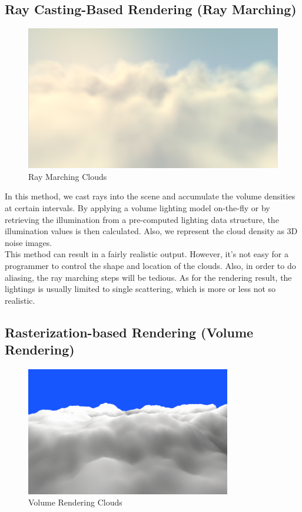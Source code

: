 \subsection{Ray Casting-Based Rendering (Ray Marching)}
\begin{figure}[htp]
\begin{center}
\includegraphics[scale=0.6]{images/raymarching.png}
\caption{Ray Marching Clouds}
\label{f3}
\end{center}
\end{figure}

In this method, we cast rays into the scene and accumulate the volume densities at certain intervals. By applying a volume lighting model on-the-fly or by retrieving the illumination from a pre-computed lighting data structure, the illumination values is then calculated. Also, we represent the cloud density as 3D noise images.\\
This method can result in a fairly realistic output. However, it's not easy for a programmer to control the shape and location of the clouds. Also, in order to do aliasing, the ray marching steps will be tedious. As for the rendering result, the lightings is usually limited to single scattering, which is more or less not so realistic.

\subsection{Rasterization-based Rendering (Volume Rendering)}
\begin{figure}[htp]
\begin{center}
\includegraphics[scale=1.0]{images/volumerendering.png}
\caption{Volume Rendering Clouds}
\label{f4}
\end{center}
\end{figure}

